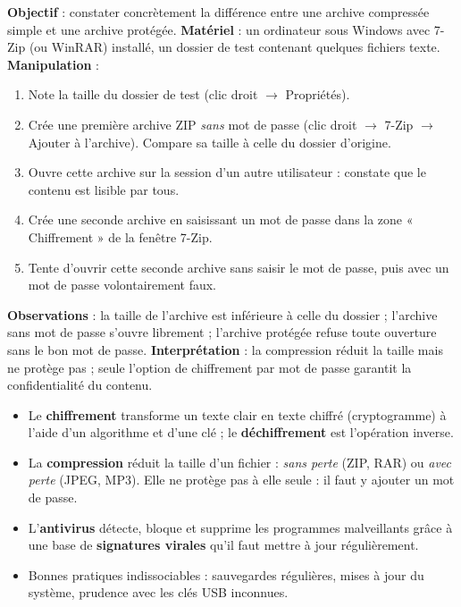 \documentclass[11pt]{article}
\begin{document}
\begin{experience}
\textbf{Objectif} : constater concrètement la différence entre une archive compressée simple et une archive protégée.
\textbf{Matériel} : un ordinateur sous Windows avec 7-Zip (ou WinRAR) installé, un dossier de test contenant quelques fichiers texte.
\textbf{Manipulation} :
\begin{enumerate}
  \item Note la taille du dossier de test (clic droit $\rightarrow$ Propriétés).
  \item Crée une première archive ZIP \emph{sans} mot de passe (clic droit $\rightarrow$ 7-Zip $\rightarrow$ Ajouter à l'archive). Compare sa taille à celle du dossier d'origine.
  \item Ouvre cette archive sur la session d'un autre utilisateur : constate que le contenu est lisible par tous.
  \item Crée une seconde archive en saisissant un mot de passe dans la zone « Chiffrement » de la fenêtre 7-Zip.
  \item Tente d'ouvrir cette seconde archive sans saisir le mot de passe, puis avec un mot de passe volontairement faux.
\end{enumerate}
\textbf{Observations} : la taille de l'archive est inférieure à celle du dossier ; l'archive sans mot de passe s'ouvre librement ; l'archive protégée refuse toute ouverture sans le bon mot de passe.
\textbf{Interprétation} : la compression réduit la taille mais ne protège pas ; seule l'option de chiffrement par mot de passe garantit la confidentialité du contenu.
\end{experience}

\begin{aretenir}
\begin{itemize}
  \item Le \textbf{chiffrement} transforme un texte clair en texte chiffré (cryptogramme) à l'aide d'un algorithme et d'une clé ; le \textbf{déchiffrement} est l'opération inverse.
  \item La \textbf{compression} réduit la taille d'un fichier : \emph{sans perte} (ZIP, RAR) ou \emph{avec perte} (JPEG, MP3). Elle ne protège pas à elle seule : il faut y ajouter un mot de passe.
  \item L'\textbf{antivirus} détecte, bloque et supprime les programmes malveillants grâce à une base de \textbf{signatures virales} qu'il faut mettre à jour régulièrement.
  \item Bonnes pratiques indissociables : sauvegardes régulières, mises à jour du système, prudence avec les clés USB inconnues.
\end{itemize}
\end{aretenir}
\end{document}
